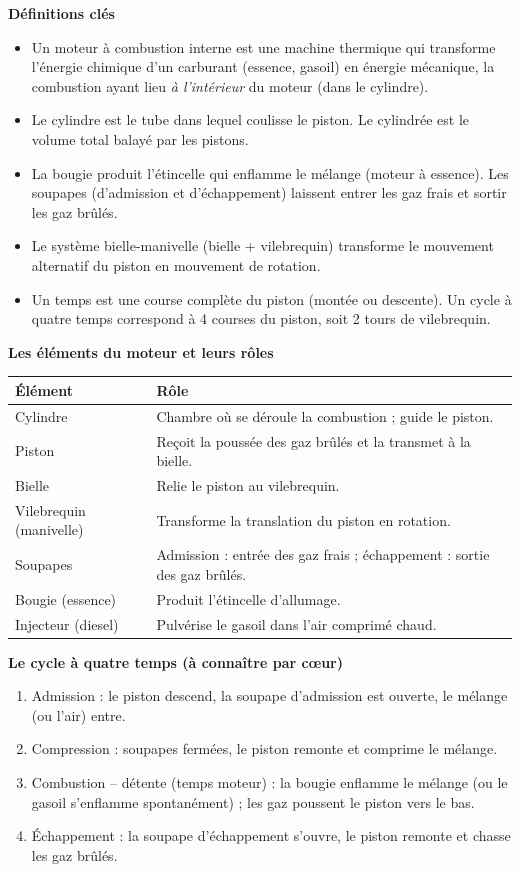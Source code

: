 \documentclass[11pt]{article}
\newcommand{\cle}[1]{{\popxbold\color{popdark}#1}}
\begin{document}
\begin{bilan}
\textbf{Définitions clés}
\begin{itemize}
\item Un \cle{moteur à combustion interne} est une machine thermique qui transforme l'énergie chimique d'un carburant (essence, gasoil) en \cle{énergie mécanique}, la combustion ayant lieu \emph{à l'intérieur} du moteur (dans le cylindre).
\item Le \cle{cylindre} est le tube dans lequel coulisse le \cle{piston}. Le \cle{cylindrée} est le volume total balayé par les pistons.
\item La \cle{bougie} produit l'étincelle qui enflamme le mélange (moteur à essence). Les \cle{soupapes} (d'admission et d'échappement) laissent entrer les gaz frais et sortir les gaz brûlés.
\item Le système \cle{bielle-manivelle} (bielle + vilebrequin) transforme le mouvement alternatif du piston en \cle{mouvement de rotation}.
\item Un \cle{temps} est une course complète du piston (montée ou descente). Un cycle à \cle{quatre temps} correspond à 4 courses du piston, soit 2 tours de vilebrequin.
\end{itemize}

\textbf{Les éléments du moteur et leurs rôles}
\begin{center}
\begin{tabularx}{\linewidth}{|l|X|}
\hline
\rowcolor{popblueL} \textbf{Élément} & \textbf{Rôle} \\
\hline
Cylindre & Chambre où se déroule la combustion ; guide le piston. \\
\hline
Piston & Reçoit la poussée des gaz brûlés et la transmet à la bielle. \\
\hline
Bielle & Relie le piston au vilebrequin. \\
\hline
Vilebrequin (manivelle) & Transforme la translation du piston en rotation. \\
\hline
Soupapes & Admission : entrée des gaz frais ; échappement : sortie des gaz brûlés. \\
\hline
Bougie (essence) & Produit l'étincelle d'allumage. \\
\hline
Injecteur (diesel) & Pulvérise le gasoil dans l'air comprimé chaud. \\
\hline
\end{tabularx}
\end{center}

\textbf{Le cycle à quatre temps (à connaître par cœur)}
\begin{enumerate}
\item \cle{Admission} : le piston descend, la soupape d'admission est ouverte, le mélange (ou l'air) entre.
\item \cle{Compression} : soupapes fermées, le piston remonte et comprime le mélange.
\item \cle{Combustion -- détente} (temps moteur) : la bougie enflamme le mélange (ou le gasoil s'enflamme spontanément) ; les gaz poussent le piston vers le bas.
\item \cle{Échappement} : la soupape d'échappement s'ouvre, le piston remonte et chasse les gaz brûlés.
\end{enumerate}


\end{bilan}
\end{document}

